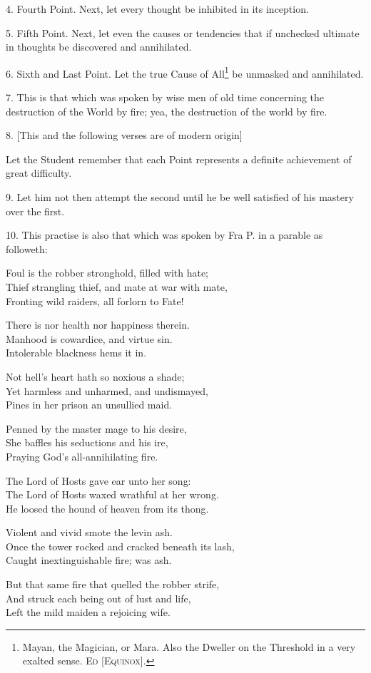 4. Fourth Point. Next, let every thought be inhibited in its inception.

5. Fifth Point. Next, let even the causes or tendencies that if unchecked ultimate in thoughts be discovered and annihilated.

6. Sixth and Last Point. Let the true Cause of All\footnote{Mayan, the Magician, or Mara. Also the Dweller on the Threshold in a very exalted sense. \textsc{Ed [Equinox]}.} be unmasked and annihilated.

7. This is that which was spoken by wise men of old time concerning the destruction of the World by fire; yea, the destruction of the world by fire.

8. [This and the following verses are of modern origin]

Let the Student remember that each Point represents a definite achievement of great difficulty.

9. Let him not then attempt the second until he be well satisfied of his mastery over the first.

10. This practise is also that which was spoken by Fra P. in a parable as followeth: \begin{tightverse}
 Foul is the robber stronghold, filled with hate; \\
Thief strangling thief, and mate at war with mate, \\
Fronting wild raiders, all forlorn to Fate!

There is nor health nor happiness therein. \\
Manhood is cowardice, and virtue sin. \\
Intolerable blackness hems it in.

Not hell’s heart hath so noxious a shade; \\
Yet harmless and unharmed, and undismayed, \\
Pines in her prison an unsullied maid.

Penned by the master mage to his desire, \\
She baffles his seductions and his ire, \\
Praying God’s all-annihilating fire.

The Lord of Hosts gave ear unto her song: \\
The Lord of Hosts waxed wrathful at her wrong. \\
He loosed the hound of heaven from its thong.

Violent and vivid smote the levin ash. \\
Once the tower rocked and cracked beneath its lash, \\
Caught inextinguishable fire; was ash.

But that same fire that quelled the robber strife, \\
And struck each being out of lust and life, \\
Left the mild maiden a rejoicing wife.
\end{tightverse}

